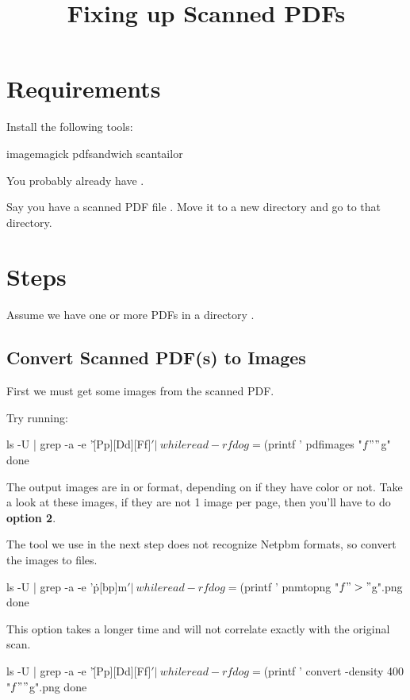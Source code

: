 
\title{Fixing up Scanned PDFs}
\date{}



\tableofcontents

\section{Requirements}

Install the following tools:
\begin{code}
imagemagick
pdfsandwich
scantailor
\end{code}
You probably already have .

Say you have a scanned PDF file .
Move it to a new directory and go to that directory.

\section{Steps}

Assume we have one or more PDFs in a directory .

\subsection{Convert Scanned PDF(s) to Images}

First we must get some images from the scanned PDF.

Try running:
\begin{code}
ls -U | grep -a -e '\.[Pp][Dd][Ff]$' | \
while read -r f
do
  g=$(printf '%
  pdfimages "$f" "$g"
done
\end{code}
The output images are in  or  format, depending on if they have color or not.
Take a look at these images, if they are not 1 image per page, then you'll have to do \textbf{option 2}.

The tool we use in the next step does not recognize Netpbm formats, so convert the images to  files.
\begin{code}
ls -U | grep -a -e '\.p[bp]m$' | \
while read -r f
do
  g=$(printf '%
  pnmtopng "$f" > "$g".png
done
\end{code}

This option takes a longer time and will not correlate exactly with the original scan.
\begin{code}
ls -U | grep -a -e '\.[Pp][Dd][Ff]$' | \
while read -r f
do
  g=$(printf '%
  convert -density 400 "$f" "$g".png
done
\end{code}

